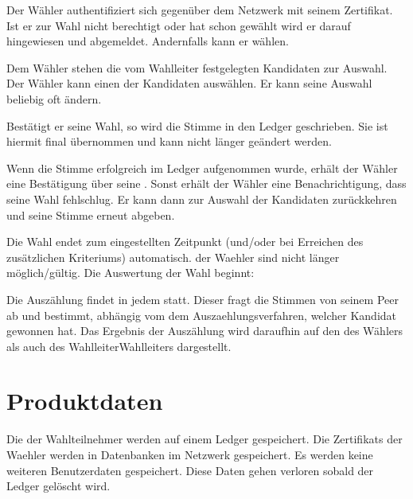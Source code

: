 \documentclass[parskip=full,11pt,twoside]{scrartcl}
\begin{document}
Der Wähler authentifiziert sich gegenüber dem Netzwerk mit seinem Zertifikat.
Ist er zur Wahl nicht berechtigt oder hat schon gewählt wird er darauf hingewiesen und abgemeldet.
Andernfalls kann er wählen.

Dem Wähler stehen die vom \gls{Wahlleiter} festgelegten Kandidaten zur Auswahl.
Der Wähler kann einen der Kandidaten auswählen.
Er kann seine Auswahl beliebig oft ändern.

Bestätigt er seine Wahl, so wird die Stimme in den \gls{Ledger} geschrieben.
Sie ist hiermit final übernommen und kann nicht länger geändert werden.

Wenn die Stimme erfolgreich im \gls{Ledger} aufgenommen wurde, erhält der Wähler eine Bestätigung über seine .
Sonst erhält der Wähler eine Benachrichtigung, dass seine Wahl fehlschlug.
Er kann dann zur Auswahl der Kandidaten zurückkehren und seine Stimme erneut abgeben.

Die \gls{Wahl} endet zum eingestellten Zeitpunkt (und/oder bei Erreichen des zusätzlichen Kriteriums) automatisch.  der \gls{Waehler} sind nicht länger möglich/gültig. Die Auswertung der \gls{Wahl} beginnt:

Die Auszählung findet in jedem  statt. Dieser fragt die Stimmen von seinem \gls{Peer} ab und bestimmt, abhängig vom dem \gls{Auszaehlungsverfahren}, welcher \gls{Kandidat} gewonnen hat. Das Ergebnis der Auszählung wird daraufhin auf den  des Wählers als auch des \gls{Wahlleiter}{Wahlleiters} dargestellt.

\section{Produktdaten}

Die  der Wahlteilnehmer werden auf einem \gls{Ledger} gespeichert.
Die \glspl{Zertifikat} der \gls{Waehler} werden in Datenbanken im Netzwerk gespeichert.
Es werden keine weiteren \gls{Benutzerdaten} gespeichert. Diese Daten gehen verloren sobald der \gls{Ledger} gelöscht wird.
\end{document}
